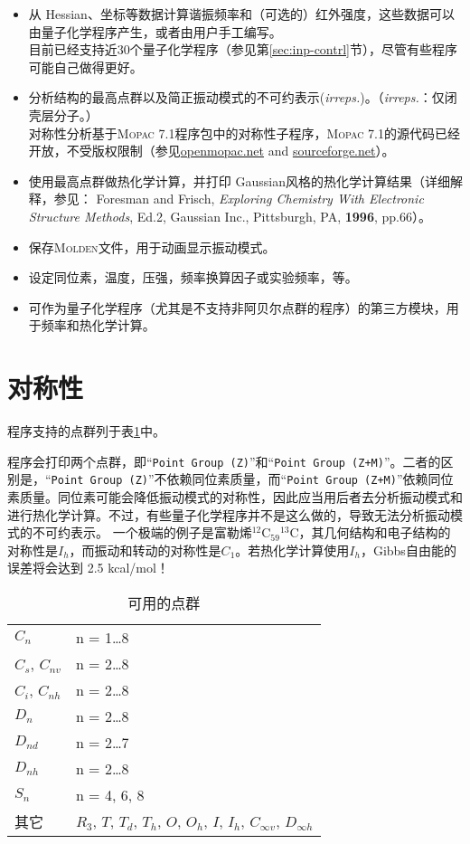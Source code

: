 \documentclass[12pt,a4paper,openany,twoside,cap]{ctexbook}
\begin{document}
\begin{itemize}
\item 从 Hessian、坐标等数据计算谐振频率和（可选的）红外强度，这些数据可以由量子化学程序产生，或者由用户手工编写。 \\
目前已经支持近30个量子化学程序（参见第\ref{sec:inp-contrl}节），尽管有些程序可能自己做得更好。
\item 分析结构的最高点群以及简正振动模式的不可约表示(\emph{irreps.})。（\emph{irreps.}：仅闭壳层分子。） \\
对称性分析基于\textsc{Mopac} 7.1程序包中的对称性子程序，\textsc{Mopac} 7.1的源代码已经开放，不受版权限制（参见\href{http://openmopac.net/Downloads/Downloads.html}{openmopac.net} and \href{https://sourceforge.net/projects/mopac7/}{sourceforge.net}）。
\item 使用最高点群做热化学计算，并打印 Gaussian风格的热化学计算结果（详细解释，参见： Foresman and Frisch, \emph{Exploring Chemistry With Electronic Structure Methods}, Ed.2, Gaussian Inc., Pittsburgh, PA, \textbf{1996}, pp.66）。
\item 保存\textsc{Molden}文件，用于动画显示振动模式。
\item 设定同位素，温度，压强，频率换算因子或实验频率，等。
\item 可作为量子化学程序（尤其是不支持非阿贝尔点群的程序）的第三方模块，用于频率和热化学计算。
\end{itemize}

\section{对称性} \label{sec:symm}

程序支持的点群列于表\ref{tab:symm}中。

程序会打印两个点群，即``\verb|Point Group (Z)|''和``\verb|Point Group (Z+M)|''。二者的区别是，``\verb|Point Group (Z)|''不依赖同位素质量，而``\verb|Point Group (Z+M)|''依赖同位素质量。同位素可能会降低振动模式的对称性，因此应当用后者去分析振动模式和进行热化学计算。不过，有些量子化学程序并不是这么做的，导致无法分析振动模式的不可约表示。
一个极端的例子是富勒烯$^{12}$C$_{59}{}^{13}$C，其几何结构和电子结构的对称性是$I_h$，而振动和转动的对称性是$C_1$。若热化学计算使用$I_h$，Gibbs自由能的误差将会达到 2.5 kcal/mol！

\begin{table}[!htbp]
\caption{可用的点群}\label{tab:symm}
\small\centering
\begin{tabular}{ll}
\hline\hline
$C_{n}$           & n = 1\ldots 8 \\
$C_s$, $C_{nv}$   & n = 2\ldots 8 \\
$C_i$, $C_{nh}$   & n = 2\ldots 8 \\
$D_{n}$           & n = 2\ldots 8 \\
$D_{nd}$          & n = 2\ldots 7 \\
$D_{nh}$          & n = 2\ldots 8 \\
$S_{n}$           & n = 4, 6, 8 \\
其它            & $R_3$, $T$, $T_d$, $T_h$, $O$, $O_h$, $I$, $I_h$, $C_{\infty v}$, $D_{\infty h}$ \\
\hline\hline
\end{tabular}
\end{table}
\end{document}
